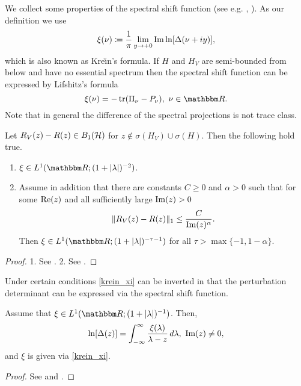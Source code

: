 We collect some properties of the spectral shift function 
(see e.g. \cite[Ch.~8]{Yafaev1992}, \cite[Ch.~0~\S~9]{Yafaev2010}).
As our definition we use
\begin{equation}\label{krein_xi}
  \xi(\nu) \coloneqq \frac{1}{\pi} \lim_{y\to +0} \operatorname{Im}\ln[\Delta(\nu+iy)] ,
\end{equation}
which is also known as Kre\u\i{}n's formula. If $H$ and $H_V$ are semi-bounded from below and
have no essential spectrum then the spectral shift function can be expressed by Lifshitz's formula
\begin{equation}\label{lifshitz}
  \xi(\nu) = -\tr(\Pi_\nu - P_\nu),\ \nu\in\R .
\end{equation}
Note that in general the difference of the spectral projections is not trace class.

\begin{lemma}\label{ssf01t}
Let $R_V(z)-R(z)\in B_1({\mathcal H})$ for $z\notin\sigma(H_V)\cup\sigma(H)$. Then the following hold true.
\begin{enumerate}
\item $\xi\in L^1(\R; (1+|\lambda|)^{-2})$.
\item Assume in addition that there are constants $C\geq 0$ and $\alpha>0$ such that
for some $\operatorname{Re}(z)$ and all sufficiently large $\operatorname{Im}(z)>0$
\begin{equation*}
  \| R_V(z) - R(z) \|_1 \leq \frac{C}{\operatorname{Im}(z)^\alpha} .
\end{equation*}
Then $\xi\in L^1(\R; (1+|\lambda|)^{-\tau-1})$ for all $\tau > \max\{-1, 1-\alpha\}$.
\end{enumerate}
\end{lemma}
\begin{proof}
1. 
See \cite[Thm. 4.1]{SinhaMohapatra1994}.
2. 
See \cite[(8.8.3)]{Yafaev1992}.
\end{proof}

Under certain conditions \eqref{krein_xi} can be inverted in that the perturbation determinant
can be expressed via the spectral shift function.

\begin{lemma}\label{ssf02t}
Assume that $\xi\in L^1(\R;(1+|\lambda|)^{-1})$. Then,
\begin{equation*}
  \ln[\Delta(z)] = \int_{-\infty}^\infty \frac{\xi(\lambda)}{\lambda-z}\, d\lambda,\ \operatorname{Im}(z)\neq 0,
\end{equation*}
and $\xi$ is given via \eqref{krein_xi}.
\end{lemma}
\begin{proof}
See \cite[(0.9.38)]{Yafaev2010} and \cite[(0.9.39)]{Yafaev2010}.
\end{proof}


